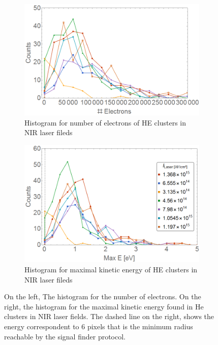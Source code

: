 \begin{figure}[h!]
\centering
\begin{subfigure}[l]{0.49\textwidth}\caption{Histogram for number of electrons of HE clusters in NIR laser fileds}
\includegraphics[width=1\textwidth]{../Images/results/NIR_He_intensityscan/Helec.png}   				\end{subfigure}
\begin{subfigure}[l]{0.49\textwidth}\caption{Histogram for maximal kinetic energy of HE clusters in NIR laser fileds}
\includegraphics[width=1\textwidth]{../Images/results/NIR_He_intensityscan/Henerg.png} 
\end{subfigure}

\caption[NIR He Intensity dependence. Histograms]{On the left, The histogram for the number of electrons. On the right, the histogram for the maximal kinetic energy found in He clusters in NIR laser fields.  The dashed line on the right, shows the energy correspondent to 6 pixels that is the minimum radius reachable by the signal finder protocol.}
\label{fig:NIRHehisto}
\end{figure}

